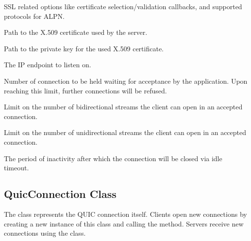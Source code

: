\begin{description}

     SSL
related options like certificate selection/validation callbacks, and supported protocols for ALPN\@.

     Path to the X.509 certificate
used by the server.

     Path to the private key for
the used X.509 certificate.

     The IP endpoint to listen on.

     Number of connection to be held
waiting for acceptance by the application. Upon reaching this limit, further connections will be
refused.

     Limit on the number of
bidirectional streams the client can open in an accepted connection.

     Limit on the number of
unidirectional streams the client can open in an accepted connection.

     The period of inactivity after which the
connection will be closed via idle timeout.

\end{description}

\subsection{QuicConnection Class}

The \QuicConnection{} class represents the QUIC connection itself. Clients open new connections by
creating a new instance of this class and calling the  method. Servers receive
new connections using the  class.

